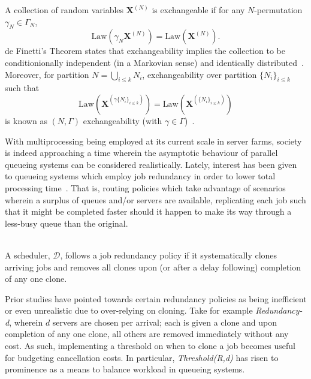 \begin{definition}[Exchangeability]
    A collection of random variables $\mathbf{X}^{(N)}$ is exchangeable if for any $N$-permutation $\gamma_{N} \in \Gamma_{N}$, \[\text{Law}(\gamma_{N} \mathbf{X}^{(N)}) = \text{Law}( \mathbf{X}^{(N)}).\] de Finetti's Theorem states that exchangeability implies the collection to be conditionionally independent (in a Markovian sense) and identically distributed~\cite{austin_exchangeable_2015}.
    Moreover, for partition $N=\bigcup_{i \leq k}N_{i}$, exchangeability over partition $\{N_{i}\}_{i\leq k }$ such that
    \[
        \text{Law}(\mathbf{X}^{(\gamma\{N_{i}\}_{i\leq k })}) = \text{Law}(\mathbf{X}^{(\{N_{i}\}_{i\leq k })})
    \] is known as $(N,\Gamma)$ exchangeability (with $\gamma \in \Gamma$)~\cite{austin_exchangeable_2008}.
\end{definition}
With multiprocessing being employed at its current scale in server farms, society is indeed approaching a time wherein the asymptotic behaviour of parallel queueing systems can be considered realistically.
Lately, interest has been given to queueing systems which employ job redundancy in order to lower total processing time~\cite{ayesta_unifying_2018}.
That is, routing policies which take advantage of scenarios wherein a surplus of queues and/or servers are available, replicating each job such that it might be completed faster should it happen to make its way through a less-busy queue than the original.
\begin{definition}
    \hfill \\
    A scheduler, $\mathcal{D}$, follows a job redundancy policy if it systematically clones arriving jobs and removes all clones upon (or after a delay following) completion of any one clone.
\end{definition}
Prior studies have pointed towards certain redundancy policies as being inefficient or even unrealistic due to over-relying on cloning.
Take for example \textit{Redundancy-d}, wherein $d$ servers are chosen per arrival;
each is given a clone and upon completion of any one clone, all others are removed immediately without any cost.
As such, implementing a threshold on when  to clone a job becomes useful for budgeting cancellation costs.
In particular, \textit{Threshold(R,d)} has risen to prominence as a means to balance workload in queueing systems.
